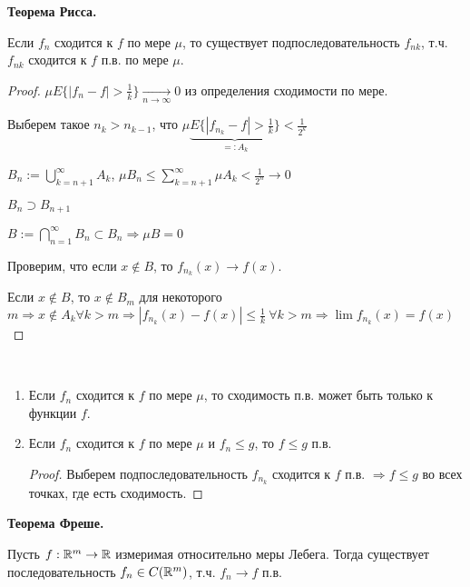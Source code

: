 \begin{theorem}
    \textbf{Теорема Рисса.}

    Если $f_n$ сходится к $f$ по мере $\mu$, то существует подпоследовательность
    $f_{nk}$, т.ч. $f_{nk}$  сходится к $f$ п.в. по мере $\mu$.
\end{theorem}

\begin{proof}
    $\mu E\{|f_n - f|> \frac{1}{k}\}\underset{n\rightarrow \infty}{\rightarrow}0$
    из определения сходимости по мере.

    Выберем такое $n_k>n_{k-1}$, что $\mu \underbrace{E\{|f_{n_k} - f|> \frac{1}{k}\}}_{=:A_k}<\frac{1}{2^k}$

    $B_n:= \bigcup\limits_{k=n+1}^\infty A_k$, $\mu B_n \leq \sum \limits_{k=n+1}^\infty \mu A_k < \frac{1}{2^n}\rightarrow 0$

    $B_n \supset B_{n+1}$

    $B:= \bigcap \limits_{n=1}^\infty B_n\subset B_n\Rightarrow \mu B=0$

    Проверим, что если $x\not \in B$, то $f_{n_k}(x)\rightarrow f(x)$.

    Если $x\not \in B$, то $x\not \in B_m$ для некоторого $m\Rightarrow x\not \in A_k\forall k > m
    \Rightarrow |f_{n_k}(x)-f(x)|\leq \frac{1}{k}\ \forall k > m\Rightarrow \lim f_{n_k}(x)=f(x)$
\end{proof}

\begin{corollary}~
    \begin{enumerate}
        \item Если $f_n$ сходится к $f$ по мере $\mu$, то сходимость п.в. может быть только
        к функции $f$.

        \item Если $f_n$ сходится к $f$ по мере $\mu$ и $f_n \leq g$, то $f\leq g$ п.в.
        
        \begin{proof}
            Выберем подпоследовательность $f_{n_k}$ сходится к $f$ п.в. $\Rightarrow f\leq g$ во всех 
            точках, где есть сходимость.
        \end{proof}
    \end{enumerate}
\end{corollary}

\begin{theorem}
    \textbf{Теорема Фреше.}

    Пусть $f:\mathbb{R}^m \rightarrow \mathbb{R}$ измеримая относительно меры Лебега. 
    Тогда существует последовательность $f_n\in C(\mathbb{R}^m)$, т.ч. $f_n\rightarrow f$ п.в.
\end{theorem}

